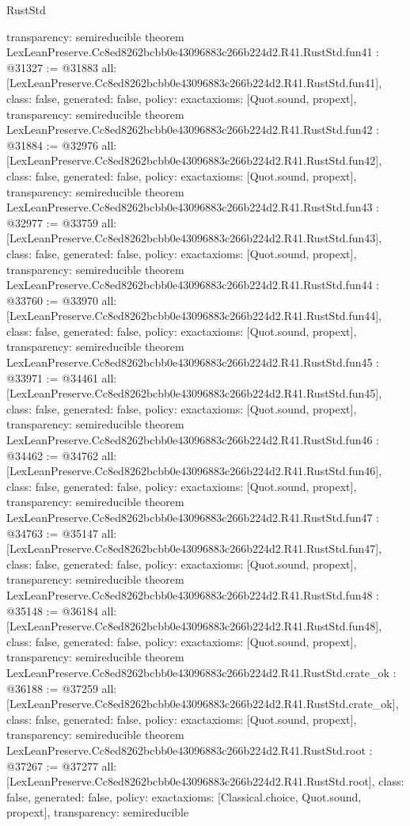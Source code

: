 \begin{lexlean}{RustStd}
\begin{coremodule}
{  transparency: semireducible
}
theorem LexLeanPreserve.Cc8ed8262bcbb0e43096883c266b224d2.R41.RustStd.fun41 : @31327 := @31883 {
  all: [LexLeanPreserve.Cc8ed8262bcbb0e43096883c266b224d2.R41.RustStd.fun41],
  class: false,
  generated: false,
  policy: exact{axioms: [Quot.sound, propext]},
  transparency: semireducible
}
theorem LexLeanPreserve.Cc8ed8262bcbb0e43096883c266b224d2.R41.RustStd.fun42 : @31884 := @32976 {
  all: [LexLeanPreserve.Cc8ed8262bcbb0e43096883c266b224d2.R41.RustStd.fun42],
  class: false,
  generated: false,
  policy: exact{axioms: [Quot.sound, propext]},
  transparency: semireducible
}
theorem LexLeanPreserve.Cc8ed8262bcbb0e43096883c266b224d2.R41.RustStd.fun43 : @32977 := @33759 {
  all: [LexLeanPreserve.Cc8ed8262bcbb0e43096883c266b224d2.R41.RustStd.fun43],
  class: false,
  generated: false,
  policy: exact{axioms: [Quot.sound, propext]},
  transparency: semireducible
}
theorem LexLeanPreserve.Cc8ed8262bcbb0e43096883c266b224d2.R41.RustStd.fun44 : @33760 := @33970 {
  all: [LexLeanPreserve.Cc8ed8262bcbb0e43096883c266b224d2.R41.RustStd.fun44],
  class: false,
  generated: false,
  policy: exact{axioms: [Quot.sound, propext]},
  transparency: semireducible
}
theorem LexLeanPreserve.Cc8ed8262bcbb0e43096883c266b224d2.R41.RustStd.fun45 : @33971 := @34461 {
  all: [LexLeanPreserve.Cc8ed8262bcbb0e43096883c266b224d2.R41.RustStd.fun45],
  class: false,
  generated: false,
  policy: exact{axioms: [Quot.sound, propext]},
  transparency: semireducible
}
theorem LexLeanPreserve.Cc8ed8262bcbb0e43096883c266b224d2.R41.RustStd.fun46 : @34462 := @34762 {
  all: [LexLeanPreserve.Cc8ed8262bcbb0e43096883c266b224d2.R41.RustStd.fun46],
  class: false,
  generated: false,
  policy: exact{axioms: [Quot.sound, propext]},
  transparency: semireducible
}
theorem LexLeanPreserve.Cc8ed8262bcbb0e43096883c266b224d2.R41.RustStd.fun47 : @34763 := @35147 {
  all: [LexLeanPreserve.Cc8ed8262bcbb0e43096883c266b224d2.R41.RustStd.fun47],
  class: false,
  generated: false,
  policy: exact{axioms: [Quot.sound, propext]},
  transparency: semireducible
}
theorem LexLeanPreserve.Cc8ed8262bcbb0e43096883c266b224d2.R41.RustStd.fun48 : @35148 := @36184 {
  all: [LexLeanPreserve.Cc8ed8262bcbb0e43096883c266b224d2.R41.RustStd.fun48],
  class: false,
  generated: false,
  policy: exact{axioms: [Quot.sound, propext]},
  transparency: semireducible
}
theorem LexLeanPreserve.Cc8ed8262bcbb0e43096883c266b224d2.R41.RustStd.crate_ok : @36188 := @37259 {
  all: [LexLeanPreserve.Cc8ed8262bcbb0e43096883c266b224d2.R41.RustStd.crate_ok],
  class: false,
  generated: false,
  policy: exact{axioms: [Quot.sound, propext]},
  transparency: semireducible
}
theorem LexLeanPreserve.Cc8ed8262bcbb0e43096883c266b224d2.R41.RustStd.root : @37267 := @37277 {
  all: [LexLeanPreserve.Cc8ed8262bcbb0e43096883c266b224d2.R41.RustStd.root],
  class: false,
  generated: false,
  policy: exact{axioms: [Classical.choice, Quot.sound, propext]},
  transparency: semireducible
}


\end{coremodule}
\end{lexlean}
